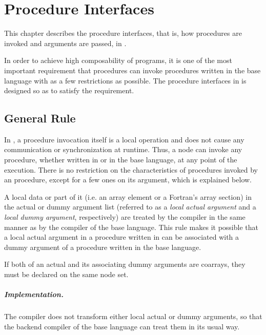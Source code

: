 \chapter{Procedure Interfaces}
\label{chap:procedure}

This chapter describes the procedure interfaces, that is, how
procedures are invoked and arguments are passed, in {\XMP}.

In order to achieve high composability of {\XMP} programs, it is one of
the most important requirement that {\XMP} procedures can invoke
procedures written in the base language with as a few restrictions as
possible. The procedure interfaces in {\XMP} is designed so as to
satisfy the requirement.


\section{General Rule}

In {\XMP}, a procedure invocation itself is a local operation and does
not cause any communication or synchronization at runtime. Thus, a node
can invoke any procedure, whether written in {\XMP} or in the base
language, at any point of the execution.
%
There is no restriction on the characteristics of procedures invoked by
an {\XMP} procedure, except for a few ones on its argument, which is
explained below.

A local data or part of it (i.e. an array element or a Fortran's array
section) in the actual or dummy argument list (referred to as a {\it
local actual argument} and a {\it local dummy argument}, respectively)
are treated by the {\XMP} compiler in the same manner as by the compiler
of the base language.
%
This rule makes it possible that a local actual argument in a procedure
written in {\XMP} can be associated with a dummy argument of a procedure
written in the base language.

If both of an actual and its associating dummy arguments are coarrays,
they must be declared on the same node set.


\paragraph{Implementation.}

The {\XMP} compiler does not transform either local actual or dummy
arguments, so that the backend compiler of the base language can treat
them in its usual way.

